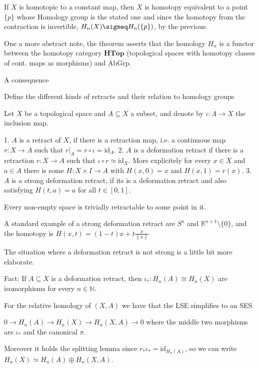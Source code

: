 If \(X\) is homotopic to a constant map, then \(X\) is homotopy equivalent to a point \(\{p\}\) whose Homology group is the stated one and since the homotopy
from the contraction is invertible, \( H_n(X) \sigmeq H_n(\{p\})\), by the previous.

One a more abstract note, the theorem asserts that the homology \( H_n \) is a functor between the homotopy category \( \textbf{HTop} \) 
(topological spaces with homotopy classes of cont. maps as morphisms) and \( \text{AbGrp} \).

A consequence

Define the different kinds of retracts and their relation to homology groups

Let \(X\) be a topological space and \(A \subseteq X\) a subset, and denote by \(\iota : A \to X\) the inclusion map. 

1. \(A\) is a retract of \(X\), if there is a retraction map, i.e. a continuous map \(r: X \to A\) such that \(r|_A = r \circ \iota = \text{id}_A\).
2. \(A\) is a deformation retract if there is a retraction \(r: X \to A\) such that \(\iota \circ r \simeq \text{id}_X\).
More explicitely for every \( x \in X \) and \( a \in A \) there is some \( H : X \times I \to A \) with \( H(x, 0) = x \) and \( H(x, 1) = r(x) \).
3. \(A\) is a strong deformation retract, if its is a deformation retract and also satisfying \( H(t, a) = a \) for all \( t \in [0, 1] \).

Every non-empty space is trivially retractable to some point in it.

A standard example of a strong deformation retract are \( S^n \) and \( \mathbb{R}^{n+1}\setminus \{0\} \),
and the homotopy is
\( H(x, t) = (1 - t)x + t\frac{x}{\|x\|} \)

The situation where a deformation retract is not strong is a little bit more elaborate.

Fact:
If \(A \subseteq X\) is a deformation retract, then \(\iota_* : H_n(A) \cong H_n(X)\) are isomorphisms for every \(n \in \mathbb{N}\).

For the relative homology of \( (X, A) \) we have that the LSE simplifies to an SES 

\( 0 \to H_n(A) \to H_n(X) \to H_n(X, A) \to 0 \)
where the middle two morphisms are \( \iota_{\ast} \) and the canonical \( \pi \).

Moreover it holds the splitting lemma since \( r_\ast \iota_\ast = \text{id}_{H_n(A)} \), so we can write
\( H_n(X) \simeq H_n(A) \oplus H_n(X, A) \).

